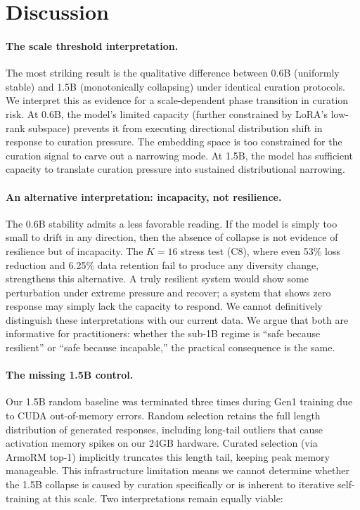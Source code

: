 \documentclass[11pt,a4paper]{article}
\begin{document}
\section{Discussion}

\paragraph{The scale threshold interpretation.}
The most striking result is the qualitative difference between 0.6B (uniformly stable) and 1.5B (monotonically collapsing) under identical curation protocols. We interpret this as evidence for a scale-dependent phase transition in curation risk. At 0.6B, the model's limited capacity (further constrained by LoRA's low-rank subspace) prevents it from executing directional distribution shift in response to curation pressure. The embedding space is too constrained for the curation signal to carve out a narrowing mode. At 1.5B, the model has sufficient capacity to translate curation pressure into sustained distributional narrowing.

\paragraph{An alternative interpretation: incapacity, not resilience.}
The 0.6B stability admits a less favorable reading. If the model is simply too small to drift in any direction, then the absence of collapse is not evidence of resilience but of incapacity. The $K{=}16$ stress test (C8), where even 53\% loss reduction and 6.25\% data retention fail to produce any diversity change, strengthens this alternative. A truly resilient system would show some perturbation under extreme pressure and recover; a system that shows zero response may simply lack the capacity to respond. We cannot definitively distinguish these interpretations with our current data. We argue that both are informative for practitioners: whether the sub-1B regime is ``safe because resilient'' or ``safe because incapable,'' the practical consequence is the same.

\paragraph{The missing 1.5B control.}
Our 1.5B random baseline was terminated three times during Gen1 training due to CUDA out-of-memory errors. Random selection retains the full length distribution of generated responses, including long-tail outliers that cause activation memory spikes on our 24GB hardware. Curated selection (via ArmoRM top-1) implicitly truncates this length tail, keeping peak memory manageable. This infrastructure limitation means we cannot determine whether the 1.5B collapse is caused by curation specifically or is inherent to iterative self-training at this scale. Two interpretations remain equally viable:
\end{document}
